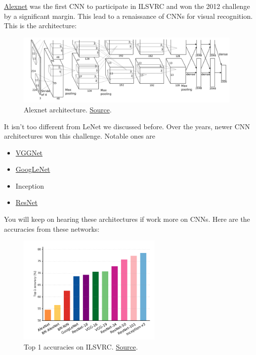 \documentclass[a4paper]{tufte-handout}
\begin{document}
\href{https://papers.nips.cc/paper/4824-imagenet-classification-with-deep-convolutional-neural-networks.pdf}{Alexnet}
was the first CNN to participate in ILSVRC and won the 2012 challenge by
a significant margin. This lead to a renaissance of CNNs for visual
recognition. This is the architecture:
\begin{figure}
\includegraphics[width=110mm]{alexnet.png}
\caption{Alexnet architecture.
\href{http://mappingignorance.org/fx/media/2013/04/Deep-learning-5.png}{Source}.
}  
\end{figure}


It isn't too different from LeNet we discussed before. Over the years,
newer CNN architectures won this challenge. Notable ones are

\begin{itemize}
\item
  \href{https://arxiv.org/pdf/1409.1556}{VGGNet}
\item
  \href{https://research.google.com/pubs/pub43022.html}{GoogLeNet}
\item
  Inception
\item
  \href{https://arxiv.org/abs/1512.03385}{ResNet}
\end{itemize}

You will keep on hearing these architectures if work more on CNNs. Here
are the accuracies from these networks:

\begin{figure}
  \includegraphics[width=70mm]{imagenet-top1.png}
  \caption{Top 1 accuracies on ILSVRC.
\href{https://chaosmail.github.io/deeplearning/2016/10/22/intro-to-deep-learning-for-computer-vision/\#Canziani16}{Source}.
}
\end{figure}
\end{document}
